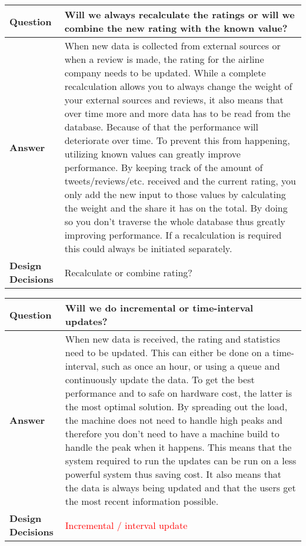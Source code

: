 \begin{longtable}{| l |  p{12cm} |}
\hline
\textbf{Question} & \textbf{Will we always recalculate the ratings or will we combine the new rating with the known value? } \\ \hline
\textbf{Answer} & When new data is collected from external sources or when a review is made, the rating for the airline company needs to be updated. While a complete recalculation allows you to always change the weight of your external sources and reviews, it also means that over time more and more data has to be read from the database. Because of that the performance will deteriorate over time.
To prevent this from happening, utilizing known values can greatly improve performance. By keeping track of the amount of tweets/reviews/etc. received and the current rating, you only add the new input to those values by calculating the weight and the share it has on the total. By doing so you don't traverse the whole database thus greatly improving performance. If a recalculation is required this could always be initiated separately.
 \\ \hline
\textbf{Design Decisions} & Recalculate or combine rating? \\ \hline
\end{longtable}

\begin{longtable}{| l |  p{12cm} |}
\hline
\textbf{Question} & \textbf{Will we do incremental or time-interval updates? } \\ \hline
\textbf{Answer} & When new data is received, the rating and statistics need to be updated. This can either be done on a time-interval, such as once an hour, or using a queue and continuously update the data. To get the best performance and to safe on hardware cost, the latter is the most optimal solution. By spreading out the load, the machine does not need to handle high peaks and therefore you don't need to have a machine build to handle the peak when it happens. This means that the system required to run the updates can be run on a less powerful system thus saving cost. It also means that the data is always being updated and that the users get the most recent information possible.
 \\ \hline
\textbf{Design Decisions} & \textcolor{red}{Incremental / interval update} \\ \hline
\end{longtable}

